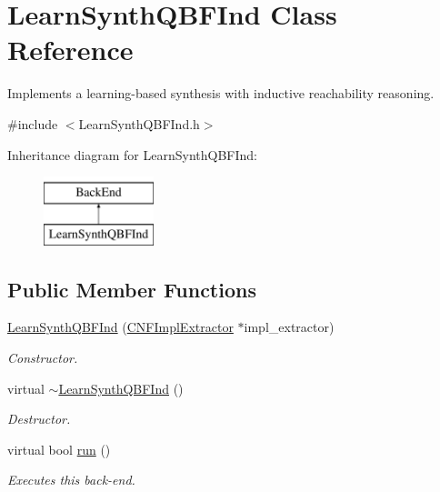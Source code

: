 \hypertarget{classLearnSynthQBFInd}{\section{Learn\-Synth\-Q\-B\-F\-Ind Class Reference}
\label{classLearnSynthQBFInd}
}


Implements a learning-\/based synthesis with inductive reachability reasoning.  




{\ttfamily \#include $<$Learn\-Synth\-Q\-B\-F\-Ind.\-h$>$}

Inheritance diagram for Learn\-Synth\-Q\-B\-F\-Ind\-:\begin{figure}[H]
\begin{center}
\leavevmode
\includegraphics[height=2.000000cm]{classLearnSynthQBFInd}
\end{center}
\end{figure}
\subsection*{Public Member Functions}
\begin{DoxyCompactItemize}
\item 
\hyperlink{classLearnSynthQBFInd_a3e05b058bbff2f55eeb054e3968a3a70}{Learn\-Synth\-Q\-B\-F\-Ind} (\hyperlink{classCNFImplExtractor}{C\-N\-F\-Impl\-Extractor} $\ast$impl\-\_\-extractor)
\begin{DoxyCompactList}\small\item\em Constructor. \end{DoxyCompactList}\item 
virtual \hyperlink{classLearnSynthQBFInd_ae7c562c17f47985549499bb1ea6d4485}{$\sim$\-Learn\-Synth\-Q\-B\-F\-Ind} ()
\begin{DoxyCompactList}\small\item\em Destructor. \end{DoxyCompactList}\item 
virtual bool \hyperlink{classLearnSynthQBFInd_a6709343a109f82c427dcbc4a576d9c03}{run} ()
\begin{DoxyCompactList}\small\item\em Executes this back-\/end. \end{DoxyCompactList}\end{DoxyCompactItemize}
